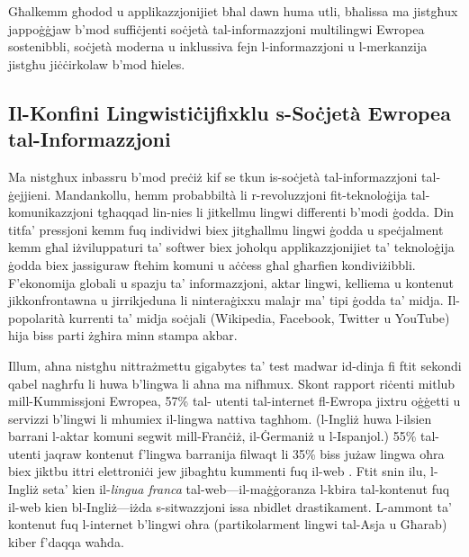 \begin{multicols}{2}
Għalkemm għodod u applikazzjonijiet bħal dawn huma utli, bħalissa ma jistgħux jappoġġjaw b'mod suffiċjenti soċjetà tal-informazzjoni multilingwi Ewropea sostenibbli, soċjetà moderna u inklussiva fejn l-informazzjoni u l-merkanzija jistgħu jiċċirkolaw b’mod ħieles.

\subsection[Il-Konfini Lingwistiċi jfixklu s-Soċjetà Ewropea tal-Informazzjoni]{Il-Konfini Lingwistiċi\newline jfixklu s-Soċjetà Ewropea tal-Informazzjoni}
  
Ma nistgħux inbassru b’mod preċiż kif se tkun is-soċjetà tal-informazzjoni tal-ġejjieni. Mandankollu, hemm probabbiltà li r-revoluzzjoni fit-teknoloġija tal-komunikazzjoni tgħaqqad lin-nies li jitkellmu lingwi differenti b'modi ġodda. Din titfa' pressjoni kemm fuq individwi biex jitgħallmu lingwi ġodda u speċjalment kemm għal iżviluppaturi ta' softwer biex joħolqu applikazzjonijiet ta' teknoloġija ġodda biex jassiguraw ftehim komuni u aċċess għal għarfien kondiviżibbli. F’ekonomija globali u spazju ta’ informazzjoni, aktar lingwi, kelliema u kontenut  jikkonfrontawna u jirrikjeduna li ninteraġixxu malajr ma’ tipi ġodda ta’ midja. Il-popolarità kurrenti ta’ midja soċjali (Wikipedia, Facebook, Twitter u YouTube) hija biss parti żgħira minn stampa akbar.



Illum, aħna nistgħu nittrażmettu gigabytes ta’ test madwar id-dinja fi ftit sekondi qabel nagħrfu li huwa b’lingwa li aħna ma nifhmux. Skont rapport riċenti mitlub mill-Kummissjoni Ewropea, 57\% tal- utenti tal-internet fl-Ewropa jixtru oġġetti u servizzi b’lingwi li mhumiex il-lingwa nattiva tagħhom. (l-Ingliż huwa l-ilsien barrani l-aktar komuni segwit mill-Franċiż, il-Ġermaniż u l-Ispanjol.) 55\% tal-utenti jaqraw kontenut f'lingwa barranija filwaqt li 35\% biss jużaw lingwa oħra biex jiktbu ittri elettroniċi jew jibagħtu kummenti fuq il-web \cite{EC1}.  Ftit snin ilu, l-Ingliż seta’ kien il-\emph{lingua franca} tal-web—il-maġġoranza l-kbira tal-kontenut fuq il-web kien bl-Ingliż—iżda s-sitwazzjoni issa nbidlet drastikament. L-ammont ta’ kontenut fuq l-internet b’lingwi oħra (partikolarment lingwi tal-Asja u Għarab) kiber f'daqqa waħda.


\end{multicols}
